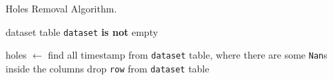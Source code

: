 %
%
\noindent\begin{minipage}[t]{0.55\linewidth}
	\begin{algorithm}[H]
		\caption{Holes Removal Algorithm.}\label{alg:holes}
		\begin{algorithmic}
			\Require dataset table
			\Ensure \texttt{dataset} \textbf{is not} empty

			\State holes $\gets$ find all timestamp from \texttt{dataset} table, where there are some \texttt{Nan}s inside the columns
			\State drop \texttt{row} from \texttt{dataset} table
			\EndIf
			\EndFor
		\end{algorithmic}
	\end{algorithm}

\end{minipage}%
\hfill%
